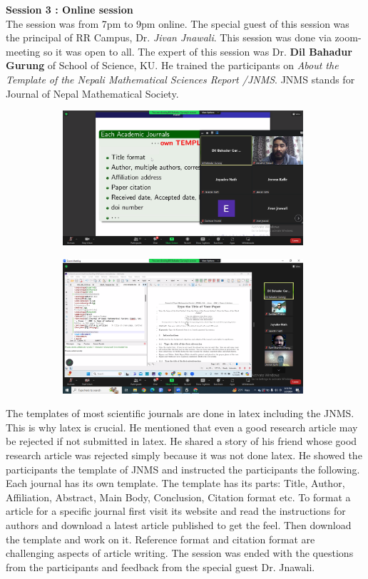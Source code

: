 \documentclass[a4paper,12pt]{report}
\begin{document}
{\bfseries \large Session 3 : Online session}\\[3mm]
The session was from 7pm to 9pm online. The special guest of this session was the principal of RR Campus, Dr. \textit{Jivan Jnawali}.  This session was done via zoom-meeting so it was open to all. The expert of this session was Dr. \textbf{Dil Bahadur Gurung} of School of Science, KU. He trained the participants on \textit{About the Template of the Nepali Mathematical Sciences Report /JNMS}. JNMS stands for Journal of Nepal Mathematical Society.

\begin{figure}[h!]
\centering
\begin{subfigure}{0.45\textwidth}
    \includegraphics[height=5cm, width=\textwidth]{online1.png}
\end{subfigure}
\hfill
\begin{subfigure}{0.45\textwidth}
    \includegraphics[height=5cm, width=\textwidth]{online2.png}
\end{subfigure}
\end{figure}

The templates of most scientific journals are done in latex including the JNMS. This is why latex is crucial. He mentioned that even a good research article may be rejected if not submitted in latex. He shared a story of his friend whose good research article was rejected simply because it was not done latex. He showed the participants the template of JNMS and instructed the participants the following.
Each journal has its own template. The template has its parts: Title, Author, Affiliation, Abstract, Main Body, Conclusion, Citation format etc. To format a article for a specific journal first visit its website and read the instructions for authors and download a latest article published to get the feel. Then download the template and work on it. Reference format and citation format are challenging aspects of article writing.
The session was ended with the questions from the participants and feedback from the special guest Dr. Jnawali.
\end{document}
